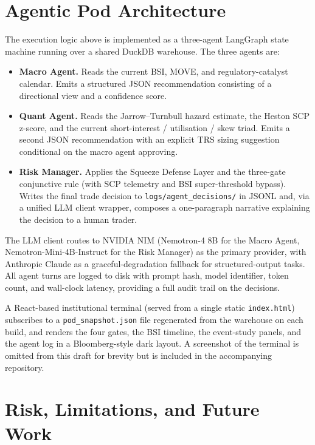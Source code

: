 \documentclass[11pt,letterpaper]{article}
\begin{document}
\section{Agentic Pod Architecture}
\label{sec:pod}

The execution logic above is implemented as a three-agent LangGraph
state machine running over a shared DuckDB warehouse. The three
agents are:

\begin{itemize}[leftmargin=2em]
\item \textbf{Macro Agent.} Reads the current BSI, MOVE, and
regulatory-catalyst calendar. Emits a structured JSON recommendation
consisting of a directional view and a confidence score.
\item \textbf{Quant Agent.} Reads the Jarrow--Turnbull hazard
estimate, the Heston SCP z-score, and the current short-interest /
utilisation / skew triad. Emits a second JSON recommendation with
an explicit TRS sizing suggestion conditional on the macro agent
approving.
\item \textbf{Risk Manager.} Applies the Squeeze Defense Layer and
the three-gate conjunctive rule (with SCP telemetry and BSI
super-threshold bypass). Writes the final trade decision to
\texttt{logs/agent\_decisions/} in JSONL and, via a unified LLM
client wrapper, composes a one-paragraph narrative explaining the
decision to a human trader.
\end{itemize}

The LLM client routes to NVIDIA NIM (Nemotron-4 8B for the Macro
Agent, Nemotron-Mini-4B-Instruct for the Risk Manager) as the primary
provider, with Anthropic Claude as a graceful-degradation fallback
for structured-output tasks. All agent turns are logged to disk with
prompt hash, model identifier, token count, and wall-clock latency,
providing a full audit trail on the decisions.

A React-based institutional terminal (served from a single static
\texttt{index.html}) subscribes to a \texttt{pod\_snapshot.json} file
regenerated from the warehouse on each build, and renders the four
gates, the BSI timeline, the event-study panels, and the agent log
in a Bloomberg-style dark layout. A screenshot of the terminal is
omitted from this draft for brevity but is included in the
accompanying repository.


\section{Risk, Limitations, and Future Work}
\label{sec:risk}
\end{document}
